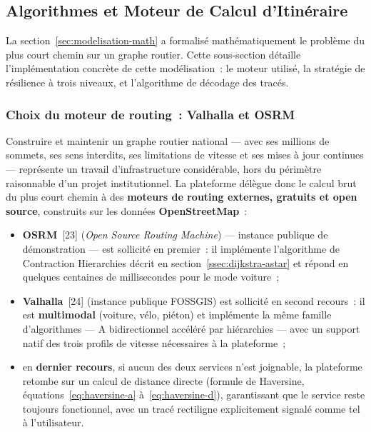 \documentclass[12pt, a4paper]{report}
\begin{document}
\subsection{Algorithmes et Moteur de Calcul d'Itinéraire}
\label{ssec:justification-algo}

La section~\ref{sec:modelisation-math} a formalisé mathématiquement le
problème du plus court chemin sur un graphe routier. Cette sous-section
détaille l'implémentation concrète de cette modélisation~: le moteur
utilisé, la stratégie de résilience à trois niveaux, et l'algorithme de
décodage des tracés.

\subsubsection{Choix du moteur de routing~: Valhalla et OSRM}

Construire et maintenir un graphe routier national --- avec ses millions de
sommets, ses sens interdits, ses limitations de vitesse et ses mises à jour
continues --- représente un travail d'infrastructure considérable, hors du
périmètre raisonnable d'un projet institutionnel. La plateforme délègue donc
le calcul brut du plus court chemin à des \textbf{moteurs de routing
externes, gratuits et open source}, construits sur les données
\textbf{OpenStreetMap}~:
\begin{itemize}[itemsep=2pt, topsep=4pt, leftmargin=1.5cm]
  \item \textbf{OSRM}~[23] (\textit{Open Source Routing Machine}) --- instance
    publique de démonstration --- est sollicité en premier~: il implémente
    l'algorithme de Contraction Hierarchies décrit en
    section~\ref{ssec:dijkstra-astar} et répond en quelques centaines de
    millisecondes pour le mode voiture~;
  \item \textbf{Valhalla}~[24] (instance publique FOSSGIS) est sollicité en
    second recours~: il est \textbf{multimodal} (voiture, vélo, piéton) et
    implémente la même famille d'algorithmes --- A\* bidirectionnel
    accéléré par hiérarchies --- avec un support natif des trois profils de
    vitesse nécessaires à la plateforme~;
  \item en \textbf{dernier recours}, si aucun des deux services n'est
    joignable, la plateforme retombe sur un calcul de distance directe
    (formule de Haversine, équations~\eqref{eq:haversine-a}
    à~\eqref{eq:haversine-d}), garantissant que le service reste toujours
    fonctionnel, avec un tracé rectiligne explicitement signalé comme tel à
    l'utilisateur.
\end{itemize}
\end{document}
